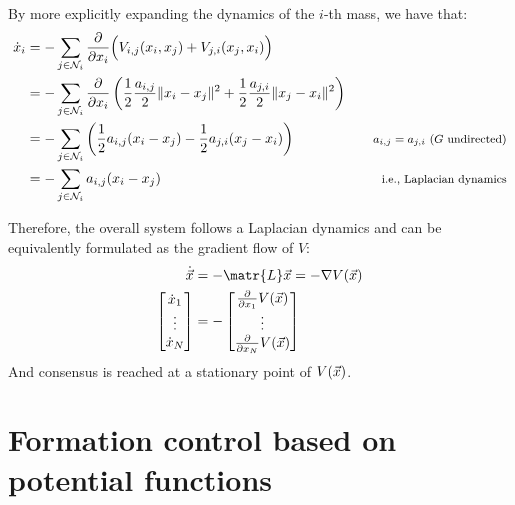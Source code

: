 \begin{description}
        By more explicitly expanding the dynamics of the $i$-th mass, we have that:
        \[
            \begin{aligned}
                \dot{x}_i
                &= - \sum_{j \in \mathcal{N}_i} \frac{\partial}{\partial x_i} \Big( V_{i,j}(x_i, x_j) + V_{j,i}(x_j, x_i) \Big) \\
                &= - \sum_{j \in \mathcal{N}_i} \frac{\partial}{\partial x_i} \left( \frac{1}{2} \frac{a_{i,j}}{2} \Vert x_i - x_j \Vert^2 + \frac{1}{2} \frac{a_{j,i}}{2} \Vert x_j - x_i \Vert^2 \right) \\
                &= - \sum_{j \in \mathcal{N}_i} \left( \frac{1}{2} a_{i,j} (x_i - x_j) - \frac{1}{2} a_{j,i} (x_j - x_i) \right) &&& \text{\footnotesize $a_{i,j}=a_{j,i}$ ($G$ undirected)} \\
                &= - \sum_{j \in \mathcal{N}_i} a_{i,j} (x_i - x_j) &&& \text{\footnotesize i.e., Laplacian dynamics}
            \end{aligned}
        \]
        
        Therefore, the overall system follows a Laplacian dynamics and can be equivalently formulated as the gradient flow of $V$:
        \[
            \begin{split}
                \dot{\x} &= -\matr{L}\x = - \nabla V(\x) \\
                \begin{bmatrix}
                    \dot{x}_1 \\ \vdots \\ \dot{x}_N
                \end{bmatrix}
                &=
                - \begin{bmatrix}
                    \frac{\partial}{\partial x_1} V(\x) \\
                    \vdots
                    \\
                    \frac{\partial}{\partial x_N} V(\x)
                \end{bmatrix}
            \end{split}
        \]
        And consensus is reached at a stationary point of $V({\vec{x}})$.
\end{description}



\section{Formation control based on potential functions}


